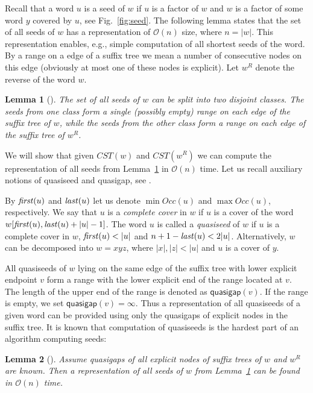\documentclass{article}
\theoremstyle{theorem}
\newtheorem{lemma}{Lemma}
\theoremstyle{definition}
\newcommand{\CST}{\mathit{CST}}
\newcommand{\firstocc}{\mbox{\textit{first}}}
\newcommand{\lastocc}{\mbox{\textit{last}}}
\newcommand{\Occ}{\mathit{Occ}}
\newcommand{\Oh}{\mathcal{O}}
\begin{document}
  Recall that a word $u$ is a seed of $w$ if $u$ is a factor of $w$ and $w$ is a factor of some
  word $y$ covered by $u$, see Fig.~\ref{fig:seed}.
  The following lemma states that the set of all seeds of $w$ has a representation of $\Oh(n)$ size, where $n=|w|$.
  This representation enables, e.g., simple computation of all shortest seeds of the word.
  By a range on a edge of a suffix tree we mean a number of consecutive nodes on this edge
  (obviously at most one of these nodes is explicit).
  Let $w^R$ denote the reverse of the word $w$.
  
  \begin{lemma}[\cite{DBLP:journals/algorithmica/IliopoulosMP96,DBLP:conf/soda/KociumakaKRRW12}]\label{lem:seeds_representation}
    The set of all seeds of $w$ can be split into two disjoint classes.
    The seeds from one class form a single (possibly empty) range on each edge of the suffix tree of $w$,
    while the seeds from the other class form a range on each edge of the suffix tree of $w^R$.
  \end{lemma}



  We will show that given $\CST(w)$ and $\CST(w^R)$ we can compute the representation
  of all seeds from Lemma~\ref{lem:seeds_representation} in $\Oh(n)$ time.
  Let us recall auxiliary notions of quasiseed and quasigap, see \cite{DBLP:conf/soda/KociumakaKRRW12}.

  By $\firstocc(u)$ and $\lastocc(u)$ let us denote $\min \Occ(u)$ and $\max \Occ(u)$, respectively.
  We say that $u$ is a \emph{complete cover} in $w$ if $u$ is a cover of
  the word $w[\firstocc(u),\lastocc(u)+|u|-1]$.
  The word $u$ is called a \textit{quasiseed} of $w$ if $u$ is a complete cover in $w$,
  $\firstocc(u) < |u|$ and $n+1 - \lastocc(u) < 2|u|$.
  Alternatively, $w$ can be decomposed into $w=xyz$, where $|x|,|z|<|u|$ and $u$ is a cover of $y$.

  All quasiseeds of $w$ lying on the same edge of the suffix tree with lower explicit endpoint $v$
  form a range with the lower explicit end of the range located at $v$.
  The length of the upper end of the range is denoted as $\textsf{quasigap}(v)$.
  If the range is empty, we set $\textsf{quasigap}(v)=\infty$.
  Thus a representation of all quasiseeds of a given word can be provided using only 
  the quasigaps of explicit nodes in the suffix tree.
  It is known that computation of quasiseeds is the hardest part of an algorithm computing seeds:

  \begin{lemma}[\cite{DBLP:journals/algorithmica/IliopoulosMP96,DBLP:conf/soda/KociumakaKRRW12}]\label{lem:quasigaps}
    Assume quasigaps of all explicit nodes of suffix trees of $w$ and $w^R$ are known.
    Then a representation of all seeds of $w$ from Lemma~\ref{lem:seeds_representation}
    can be found in $\Oh(n)$ time.
  \end{lemma}
\end{document}
